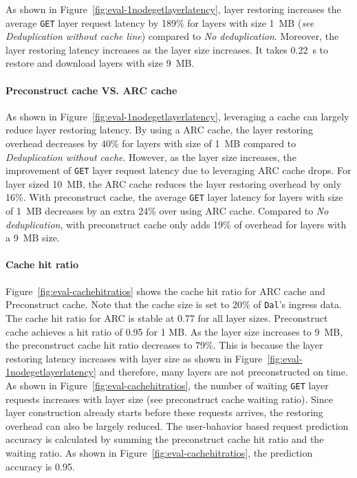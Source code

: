 As shown in Figure~\ref{fig:eval-1nodegetlayerlatency}, layer restoring increases the average \texttt{GET} layer request latency by 189\% for layers with size 1~MB (\emph{see Deduplication without cache line}) compared to \emph{No deduplication}.
Moreover, the layer restoring latency increases as the layer size increases.
It takes 0.22~s to restore and download layers with size 9~MB.

\paragraph{Preconstruct cache VS. ARC cache}
As shown in Figure~\ref{fig:eval-1nodegetlayerlatency}, 
leveraging a cache can largely reduce layer restoring latency.
By using a ARC cache, the layer restoring overhead decreases by 40\% for layers with size of 1~MB compared to \emph{Deduplication without cache}.
However, as the layer size increases, the improvement of \texttt{GET} layer request latency due to leveraging ARC cache drops.
For layer sized 10~MB, the ARC cache reduces the layer restoring overhead by only 16\%.
With \sysname preconstruct cache, the average \texttt{GET} layer latency for layers with size of 1~MB decreases by an extra 24\% over using ARC cache.
Compared to \emph{No deduplication}, \sysname with preconstruct cache only adds 19\% of overhead for layers with a 9~MB size. 

\paragraph{Cache hit ratio}
Figure~\ref{fig:eval-cachehitratios} shows the cache hit ratio for ARC cache and Preconstruct cache.
Note that the cache size is set to 20\% of \texttt{Dal}'s ingress data.
The cache hit ratio for ARC is stable at 0.77 for all layer sizes.
Preconstruct cache achieves a hit ratio of 0.95 for 1 MB.
As the layer size increases to 9~MB, the preconstruct cache hit ratio decreases to 79\%. 
This is because the layer restoring latency increases with layer size as shown in Figure~\ref{fig:eval-1nodegetlayerlatency} and therefore, many layers are not preconstructed on time.
As shown in Figure~\ref{fig:eval-cachehitratios}, the number of waiting \texttt{GET} layer requests increases with layer size (see preconstruct cache waiting ratio).
Since layer construction already starts before these requests arrives, the restoring overhead can also be largely reduced.
The user-bahavior based request prediction accuracy is calculated by summing the preconstruct cache hit ratio and the waiting ratio.
As shown in Figure~\ref{fig:eval-cachehitratios}, the prediction accuracy is 0.95.
 
